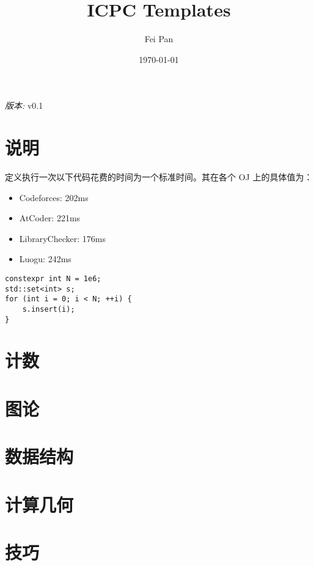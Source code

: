 \documentclass[12pt]{ctexart}
\title{ICPC Templates}
\date{\today}
\author{Fei Pan}
\newcommand{\version}{v0.1}
\begin{document}
\maketitle
\begin{center}
    \textit{版本: }\version
\end{center}

\tableofcontents
\newpage

\section{说明}

定义执行一次以下代码花费的时间为一个标准时间。其在各个 OJ 上的具体值为：

\begin{itemize}
\item Codeforces: 202ms
\item AtCoder: 221ms
\item LibraryChecker: 176ms
\item Luogu: 242ms
\end{itemize}
\begin{lstlisting}
constexpr int N = 1e6;
std::set<int> s;
for (int i = 0; i < N; ++i) {
    s.insert(i);
}
\end{lstlisting}
\newpage

\section{计数}



\section{图论}



\section{数据结构}


\section{计算几何}


\section{技巧}

\end{document}
